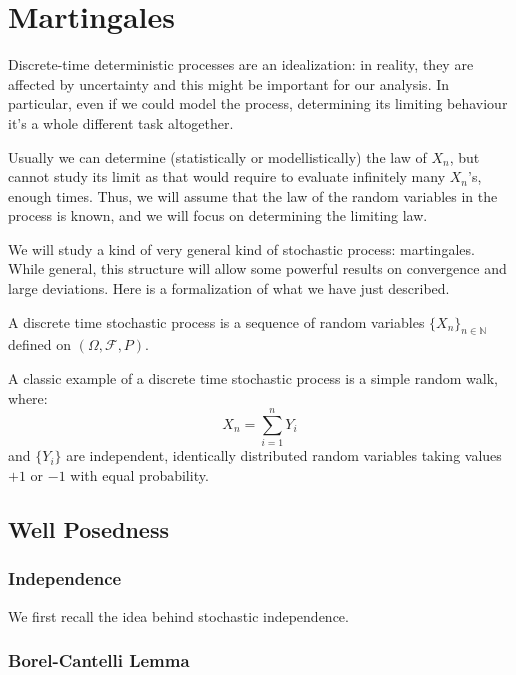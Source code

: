 
\chapter{Martingales}
Discrete-time deterministic processes are an idealization: in reality, they are affected by uncertainty and this might be important for our analysis. In particular, even if we could model the process, determining its limiting behaviour it's a whole different task altogether. 

Usually we can determine (statistically or modellistically) the law of $X_n$, but cannot study its limit as that would require to evaluate infinitely many $X_n$'s, enough times. 
Thus, we will assume that the law of the random variables in the process is known, and we will focus on determining the limiting law.

We will study a kind of very general kind of stochastic process: martingales. While general, this structure will allow some powerful results on convergence and large deviations. Here is a formalization of what we have just described.

\begin{my_definition}
A discrete time stochastic process is a sequence of random variables 
$\{X_n\}_{n \in \mathbb{N}}$ defined on $(\Omega, \mathcal{F}, P)$.
\end{my_definition}

\begin{my_example}
A classic example of a discrete time stochastic process is a simple random walk, where:
\[X_n = \sum_{i=1}^n Y_i\]
and $\{Y_i\}$ are independent, identically distributed random variables taking values $+1$ or $-1$ with equal probability.
\end{my_example}

\section{Well Posedness}
\subsection{Independence}
We first recall the idea behind stochastic independence.
\subsection{Borel-Cantelli Lemma}

